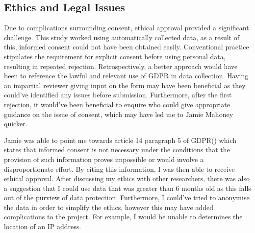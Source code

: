 \subsection{Ethics and Legal Issues}

Due to complications surrounding consent, ethical approval provided a significant challenge. This study worked using automatically collected data, as a result of this, informed consent could not have been obtained easily. Conventional practice stipulates the requirement for explicit consent before using personal data, resulting in repeated rejection. Retrospectively, a better approach would have been to reference the lawful and relevant use of GDPR in data collection. Having an impartial reviewer giving input on the form may have been beneficial as they could've identified any issues before submission. Furthermore, after the first rejection, it would've been beneficial to enquire who could give appropriate guidance on the issue of consent, which may have led me to Jamie Mahoney quicker. 

Jamie was able to point me towards article 14 paragraph 5 of GDPR(\cite{european_commission_regulation_2016}) which states that informed consent is not necessary under the conditions that the provision of such information proves impossible or would involve a disproportionate effort. By citing this information, I was then able to receive ethical approval. After discussing my ethics with other researchers, there was also a suggestion that I could use data that was greater than 6 months old as this falls out of the purview of data protection. Furthermore, I could've tried to anonymise the data in order to simplify the ethics, however this may have added complications to the project. For example, I would be unable to determines the location of an IP address.